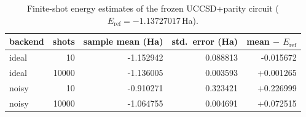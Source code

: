 \begin{table}[H]
\centering\small
\begin{tabular}{lrrrr}
\toprule
backend & shots & sample mean (Ha) & std.\ error (Ha) & mean $-$ $E_\mathrm{ref}$ \\
\midrule
ideal & 10 & -1.152942 & 0.088813 & -0.015672 \\
ideal & 10000 & -1.136005 & 0.003593 & +0.001265 \\
noisy & 10 & -0.910271 & 0.323421 & +0.226999 \\
noisy & 10000 & -1.064755 & 0.004691 & +0.072515 \\
\bottomrule
\end{tabular}
\caption{Finite-shot energy estimates of the frozen UCCSD+parity circuit ($E_\mathrm{ref}=-1.13727017$\,Ha).}
\end{table}
